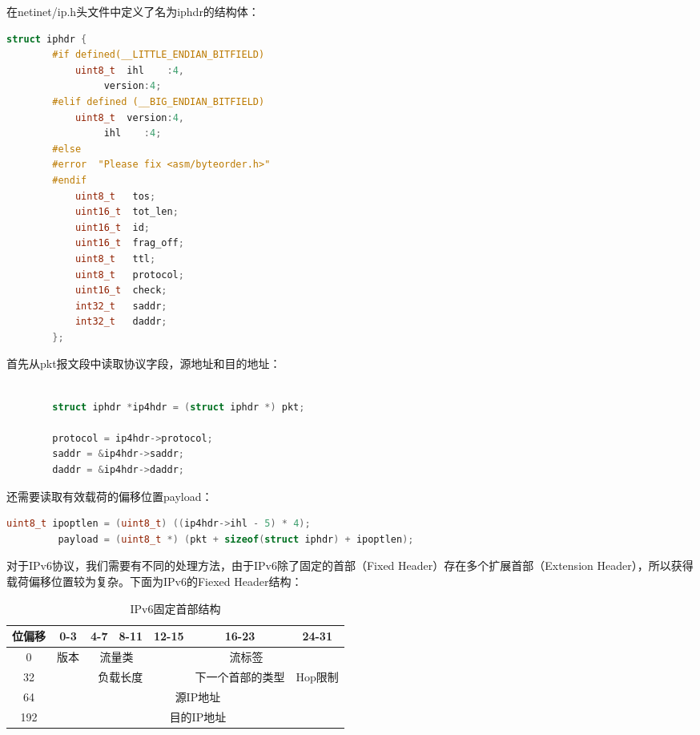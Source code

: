 \documentclass[format=final, language=chinese, degree=bachelor]{hustthesis}
\begin{document}
在netinet/ip.h头文件中定义了名为iphdr的结构体：
\begin{lstlisting}[language=c]
        struct iphdr {
        #if defined(__LITTLE_ENDIAN_BITFIELD)
            uint8_t  ihl    :4,
                 version:4;
        #elif defined (__BIG_ENDIAN_BITFIELD)
            uint8_t  version:4,
                 ihl    :4;
        #else
        #error	"Please fix <asm/byteorder.h>"
        #endif
            uint8_t	  tos;
            uint16_t  tot_len;
            uint16_t  id;
            uint16_t  frag_off;
            uint8_t   ttl;
            uint8_t   protocol;
            uint16_t  check;
            int32_t   saddr;
            int32_t   daddr;
        };
\end{lstlisting}

首先从pkt报文段中读取协议字段，源地址和目的地址：

\begin{lstlisting}[language=c]

        struct iphdr *ip4hdr = (struct iphdr *) pkt;

        protocol = ip4hdr->protocol;
        saddr = &ip4hdr->saddr;
        daddr = &ip4hdr->daddr;

\end{lstlisting}

还需要读取有效载荷的偏移位置payload：

\begin{lstlisting}[language=c]
         uint8_t ipoptlen = (uint8_t) ((ip4hdr->ihl - 5) * 4);
         payload = (uint8_t *) (pkt + sizeof(struct iphdr) + ipoptlen);
\end{lstlisting}

对于IPv6协议，我们需要有不同的处理方法，由于IPv6除了固定的首部（Fixed Header）存在多个扩展首部（Extension Header），所以获得载荷偏移位置较为复杂。下面为IPv6的Fiexed Header结构：


\begin{table}[h!]
\centering
\caption{IPv6固定首部结构}\label{tab:1}
\begin{tabular}{|c|c|c|c|c|c|c|}
	\hline
	位偏移 & 0-3 & 4-7 & 8-11 & 12-15 & 16-23 & 24-31\\
	\hline
	0 & 版本 & \multicolumn{2}{c|}{流量类} & \multicolumn{3}{c|}{流标签}\\
	\hline
	32 & \multicolumn{4}{c|}{负载长度} & 下一个首部的类型 & Hop限制 \\
	\hline
	64 & \multicolumn{6}{c|}{源IP地址} \\
	\hline
	192 & \multicolumn{6}{c|}{目的IP地址} \\
	\hline
\end{tabular}
\end{table}
\end{document}

